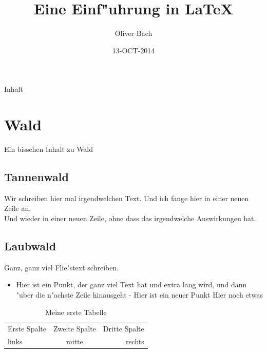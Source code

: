 \documentclass{article}
\begin{document}
	\date{13-OCT-2014}
	\title{Eine Einf"uhrung in LaTeX}
	\author{Oliver Bach}

\maketitle

\tableofcontents

	\newpage

\listoftables

\listoffigures

	\newpage

Inhalt

\section{Wald}

	Ein bisschen Inhalt zu Wald

 \subsection{Tannenwald}

	Wir schreiben hier mal irgendwelchen Text.
	Und ich fange hier in einer neuen Zeile an. \\
	Und wieder in einer neuen Zeile, ohne dass das
	irgendwelche Auswirkungen hat.

\newpage

 \subsection{Laubwald}

	Ganz, ganz viel Flie"stext schreiben.

	\begin{itemize}
		\item Hier ist ein Punkt, der ganz viel Text hat und extra lang wird, und dann "uber die n"achste Zeile hinausgeht
		 \subitem - Hier ist ein neuer Punkt
		 \subitem Hier noch etwas
	\end{itemize}


	\begin{table}

		\begin{tabular}[h]{l|c|r}
	 	\hline
			Erste Spalte &	Zweite Spalte	& Dritte Spalte	\\
			links		& mitte		& rechts	\\
		\hline
		\end{tabular}

	\caption{Meine erste Tabelle}
	\label{erstetabelle}

	\end{table}
\end{document}
